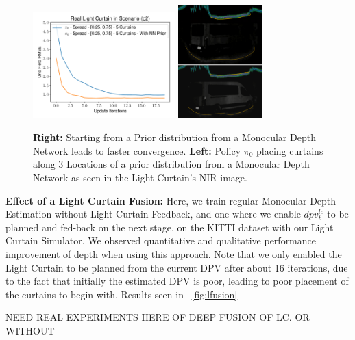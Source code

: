 \begin{figure}[h]
   \centering
   \begin{minipage}{0.5\textwidth}
       \centering
       \includegraphics[width=0.49\textwidth]{figures/figure_X.pdf}
       \includegraphics[width=0.29\textwidth]{figures/placement3.png}
   \end{minipage}\hfill
   \centering
   \caption{ \textbf{Right:} Starting from a Prior distribution from a Monocular Depth Network leads to faster convergence. \textbf{Left:} Policy $\pi_{0}$ placing curtains along 3 Locations of a prior distribution from a Monocular Depth Network as seen in the Light Curtain's NIR image.}
   \label{fig:prior} 
\end{figure}

\textbf{Effect of a Light Curtain Fusion:} Here, we train regular Monocular Depth Estimation without Light Curtain Feedback, and one where we enable $dpv_{t}^{lc}$ to be planned and fed-back on the next stage, on the KITTI dataset with our Light Curtain Simulator. We observed quantitative and qualitative performance improvement of depth when using this approach. Note that we only enabled the Light Curtain to be planned from the current DPV after about 16 iterations, due to the fact that initially the estimated DPV is poor, leading to poor placement of the curtains to begin with. Results seen in ~\ref{fig:lfusion} 

NEED REAL EXPERIMENTS HERE OF DEEP FUSION OF LC. OR WITHOUT 


